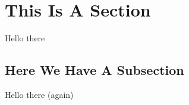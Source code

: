 \documentclass[twoside]{scrartcl}
\begin{document}
\section{This Is A Section}

Hello there

\newpage

	\subsection{Here We Have A Subsection}

Hello there (again)
\end{document}
